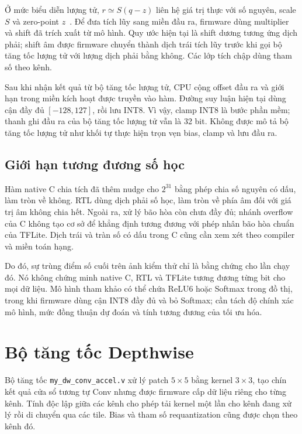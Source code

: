 Ở mức biểu diễn lượng tử, $r\simeq S(q-z)$ liên hệ giá trị thực với số nguyên, scale $S$ và zero-point $z$~\cite[Section~2.1, Eq.~(1)]{jacob2018quantization}. Để đưa tích lũy sang miền đầu ra, firmware dùng multiplier và shift đã trích xuất từ mô hình. Quy ước hiện tại là shift dương tương ứng dịch phải; shift âm được firmware chuyển thành dịch trái tích lũy trước khi gọi bộ tăng tốc lượng tử với lượng dịch phải bằng không. Các lớp tích chập dùng tham số theo kênh.

Sau khi nhận kết quả từ bộ tăng tốc lượng tử, CPU cộng offset đầu ra và giới hạn trong miền kích hoạt được truyền vào hàm. Đường suy luận hiện tại dùng cận đầy đủ $[-128,127]$, rồi lưu INT8. Vì vậy, clamp INT8 là bước phần mềm; thanh ghi đầu ra của bộ tăng tốc lượng tử vẫn là 32 bit. Không được mô tả bộ tăng tốc lượng tử như khối tự thực hiện trọn vẹn bias, clamp và lưu đầu ra.

\subsection{Giới hạn tương đương số học}
Hàm native C chia tích đã thêm nudge cho $2^{31}$ bằng phép chia số nguyên có dấu, làm tròn về không. RTL dùng dịch phải số học, làm tròn về phía âm đối với giá trị âm không chia hết. Ngoài ra, xử lý bão hòa còn chưa đầy đủ; nhánh overflow của C không tạo cơ sở để khẳng định tương đương với phép nhân bão hòa chuẩn của TFLite. Dịch trái và tràn số có dấu trong C cũng cần xem xét theo compiler và miền toán hạng.

Do đó, sự trùng điểm số cuối trên ảnh kiểm thử chỉ là bằng chứng cho lần chạy đó. Nó không chứng minh native C, RTL và TFLite tương đương từng bit cho mọi dữ liệu. Mô hình tham khảo có thể chứa ReLU6 hoặc Softmax trong đồ thị, trong khi firmware dùng cận INT8 đầy đủ và bỏ Softmax; cần tách độ chính xác mô hình, mức đồng thuận dự đoán và tính tương đương của tối ưu hóa.

\newpage
\section{Bộ tăng tốc Depthwise}
Bộ tăng tốc \texttt{my\_dw\_conv\_accel.v} xử lý patch $5\times5$ bằng kernel $3\times3$, tạo chín kết quả cửa sổ tương tự Conv nhưng được firmware cấp dữ liệu riêng cho từng kênh. Tính độc lập giữa các kênh cho phép tải kernel một lần cho kênh đang xử lý rồi di chuyển qua các tile. Bias và tham số requantization cũng được chọn theo kênh đó.

